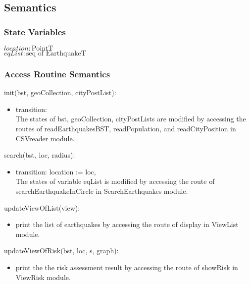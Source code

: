 \documentclass[12pt]{article}
\begin{document}
\newpage

\subsection* {Semantics}

\subsubsection* {State Variables}
$\mathit{location} : \mbox{PointT}$ \\
$\mathit{eqList} : \mbox{seq of EarthquakeT}$

\subsubsection* {Access Routine Semantics}

\noindent init(bst, geoCollection, cityPostList):
\begin{itemize}
\item transition: \\
The states of bst, geoCollection, cityPostLists are modified by accessing the routes of readEarthquakesBST, readPopulation, and readCityPosition  in CSVreader module.
\end{itemize}

\noindent search(bst, loc, radius):
\begin{itemize}
\item transition: location := loc,\\
The states of variable eqList is modified by accessing the route of searchEarthquakeInCircle in SearchEarthquakes module.
\end{itemize}


\noindent updateViewOfList(view):
\begin{itemize}
\item print the list of earthquakes by accessing the route of display in ViewList module.
\end{itemize}

\noindent updateViewOfRisk(bst, loc, s, graph):
\begin{itemize}
\item print the the risk assessment result by accessing the route of showRisk in ViewRisk module.
\end{itemize}
\end{document}
